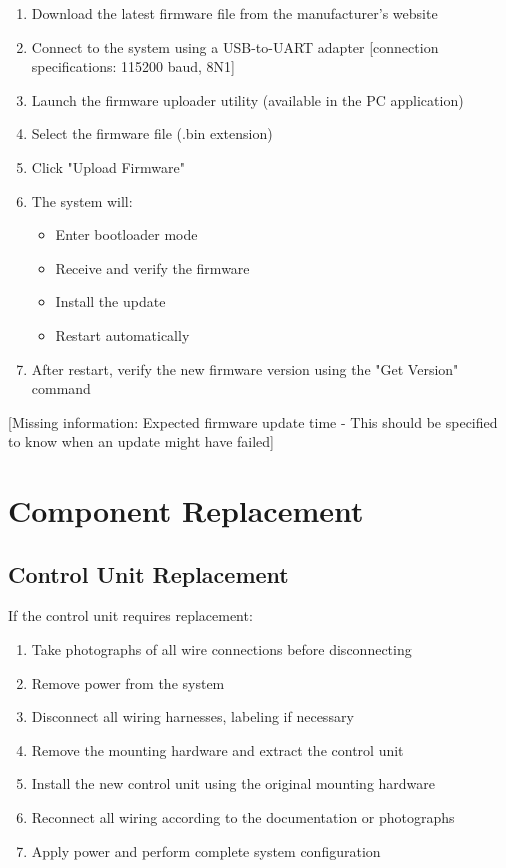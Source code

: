 \documentclass[12pt,a4paper,twoside,openright]{book}
\begin{document}
\begin{enumerate}
    \item Download the latest firmware file from the manufacturer's website
    \item Connect to the system using a USB-to-UART adapter [connection specifications: 115200 baud, 8N1]
    \item Launch the firmware uploader utility (available in the PC application)
    \item Select the firmware file (.bin extension)
    \item Click "Upload Firmware"
    \item The system will:
    \begin{itemize}
        \item Enter bootloader mode
        \item Receive and verify the firmware
        \item Install the update
        \item Restart automatically
    \end{itemize}
    \item After restart, verify the new firmware version using the "Get Version" command
\end{enumerate}

{\color{missingred}[Missing information: Expected firmware update time - This should be specified to know when an update might have failed]}

\section{Component Replacement}

\subsection{Control Unit Replacement}

If the control unit requires replacement:

\begin{enumerate}
    \item Take photographs of all wire connections before disconnecting
    \item Remove power from the system
    \item Disconnect all wiring harnesses, labeling if necessary
    \item Remove the mounting hardware and extract the control unit
    \item Install the new control unit using the original mounting hardware
    \item Reconnect all wiring according to the documentation or photographs
    \item Apply power and perform complete system configuration
\end{enumerate}
\end{document}
